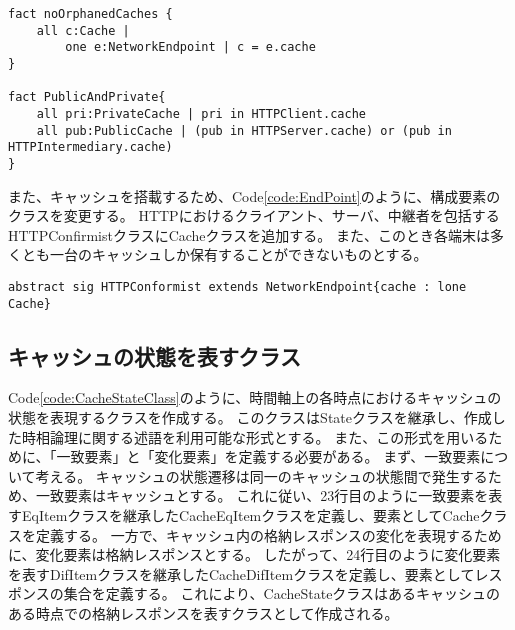 \documentclass[12pt,a4paper]{jbook}
\begin{document}
\begin{lstlisting}[caption=Cacheクラスの制限, label=code:LimitedCacheClass]
fact noOrphanedCaches {
	all c:Cache |
		one e:NetworkEndpoint | c = e.cache
}

fact PublicAndPrivate{
	all pri:PrivateCache | pri in HTTPClient.cache
	all pub:PublicCache | (pub in HTTPServer.cache) or (pub in HTTPIntermediary.cache)
}
\end{lstlisting}

また、キャッシュを搭載するため、Code\ref{code:EndPoint}のように、構成要素のクラスを変更する。
HTTPにおけるクライアント、サーバ、中継者を包括するHTTPConfirmistクラスにCacheクラスを追加する。
また、このとき各端末は多くとも一台のキャッシュしか保有することができないものとする。
\begin{lstlisting}[caption=HTTPを利用するウェブの構成要素, label=code:EndPoint]
abstract sig HTTPConformist extends NetworkEndpoint{cache : lone Cache}
\end{lstlisting}

\subsection{キャッシュの状態を表すクラス}
Code\ref{code:CacheStateClass}のように、時間軸上の各時点におけるキャッシュの状態を表現するクラスを作成する。
このクラスはStateクラスを継承し、作成した時相論理に関する述語を利用可能な形式とする。
また、この形式を用いるために、「一致要素」と「変化要素」を定義する必要がある。
まず、一致要素について考える。
キャッシュの状態遷移は同一のキャッシュの状態間で発生するため、一致要素はキャッシュとする。
これに従い、23行目のように一致要素を表すEqItemクラスを継承したCacheEqItemクラスを定義し、要素としてCacheクラスを定義する。
一方で、キャッシュ内の格納レスポンスの変化を表現するために、変化要素は格納レスポンスとする。
したがって、24行目のように変化要素を表すDifItemクラスを継承したCacheDifItemクラスを定義し、要素としてレスポンスの集合を定義する。
これにより、CacheStateクラスはあるキャッシュのある時点での格納レスポンスを表すクラスとして作成される。
\end{document}
